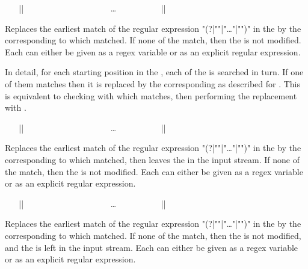 \documentclass[oneside]{book}
\begin{document}
\begin{function}{\regexReplaceCaseOnce}
\begin{syntax}
~ ~ |{|
~ ~ ~ ~  
~ ~ ~ ~  
~ ~ ~ ~ \ldots
~ ~ ~ ~  
~ ~ |}| 
\end{syntax}
Replaces the earliest match of the regular expression
"(?|""|"\dots"|"")" in the 
by the  corresponding to which  matched.
If none of the  match, then the
 is not modified. Each  can either be given as a regex
variable or as an explicit regular expression.
\par
In detail, for each starting position in the , each
of the  is searched in turn.  If one of them matches
then it is replaced by the corresponding  as
described for .  This is equivalent to
checking with  which  matches,
then performing the replacement with .
\end{function}

\begin{function}{\regexReplaceCaseOnceT}
\begin{syntax}
~ ~ |{|
~ ~ ~ ~  
~ ~ ~ ~  
~ ~ ~ ~ \ldots
~ ~ ~ ~  
~ ~ |}| 
~ ~ 
\end{syntax}
Replaces the earliest match of the regular expression
"(?|""|"\dots"|"")" in the 
by the  corresponding to which
 matched, then leaves the  in the
input stream. If none of the  match, then the
 is not modified. Each  can either be given as a regex
variable or as an explicit regular expression.
\end{function}

\begin{function}{\regexReplaceCaseOnceF}
\begin{syntax}
~ ~ |{|
~ ~ ~ ~  
~ ~ ~ ~  
~ ~ ~ ~ \ldots
~ ~ ~ ~  
~ ~ |}| 
~ ~ 
\end{syntax}
Replaces the earliest match of the regular expression
"(?|""|"\dots"|"")" in the 
by the  corresponding to which
 matched. If none of the  match, then the
 is not modified, and the  is left in
the input stream.  Each  can either be given as a regex
variable or as an explicit regular expression.
\end{function}
\end{document}
